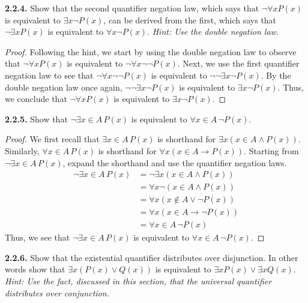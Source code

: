 \documentclass[12pt]{amsart}
\newenvironment{statement}[1]{\smallskip\noindent\color[rgb]{.6627, .3529, .6314} {\bf #1.}}{}
\theoremstyle{definition}
\theoremstyle{remark}
\begin{document}
\begin{statement}{2.2.4}
Show that the second quantifier negation law, 
which says that $\neg \forall x P(x)$ is equivalent to $\exists x \neg P(x)$,
can be derived from the first,
which says that $\neg \exists x P(x)$ is equivalent to $\forall x \neg P(x)$.
\emph{Hint: Use the double negation law.}
\end{statement}

\begin{proof}
Following the hint, we start by using the double negation law to observe that $\neg \forall x P(x)$
is equivalent to $\neg \forall x \neg \neg P(x)$.
Next, we use the first quantifier negation law to see that $\neg \forall x \neg \neg P(x)$
is equivalent to $\neg \neg \exists x \neg P(x)$.
By the double negation law once again, $\neg \neg \exists x \neg P(x)$ 
is equivalent to $\exists x \neg P(x)$.
Thus, we conclude that $\neg \forall x P(x)$ is equivalent to $\exists x \neg P(x)$.
\end{proof}


\begin{statement}{2.2.5}
Show that $\neg \exists x \in A \, P(x)$ is equivalent to $\forall x \in A \, \neg P(x)$.
\end{statement}

\begin{proof}
We first recall that $\exists x \in A \, P(x)$ is shorthand for $\exists x (x \in A \wedge P(x))$.
Similarly, $\forall x \in A \, P(x)$ is shorthand for $\forall x (x \in A \rightarrow P(x))$.
Starting from $\neg \exists x \in A \, P(x)$, expand the shorthand and use the quantifier negation laws.
\begin{align*}
	\neg \exists x \in A \, P(x)
	&= \neg \exists x (x \in A \wedge P(x)) \\
	&= \forall x \neg (x \in A \wedge P(x)) \\
	&= \forall x (x \notin A \vee \neg P(x)) \\
	&= \forall x (x \in A \rightarrow \neg P(x)) \\
	&= \forall x \in A \, \neg P(x)
\end{align*}
Thus, we see that $\neg \exists x \in A \, P(x)$ is equivalent to $\forall x \in A \, \neg P(x)$.
\end{proof}


\begin{statement}{2.2.6}
Show that the existential quantifier distributes over disjunction.
In other words show that $\exists x (P(x) \vee Q(x))$ is equivalent to $\exists x P(x) \vee \exists x Q(x)$.
\emph{Hint: Use the fact, discussed in this section, that the universal quantifier distributes over conjunction.}
\end{statement}
\end{document}
